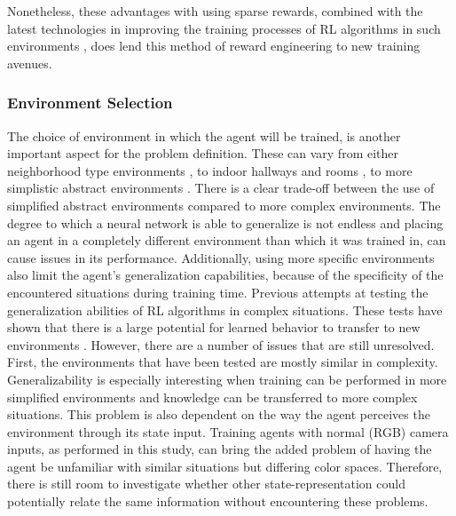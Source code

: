 Nonetheless, these advantages with using sparse rewards, combined with the latest 
technologies in improving the training processes of RL algorithms in 
such environments \cite{HER}, does lend this method of reward engineering 
to new training avenues.  

\subsubsection{Environment Selection}
The choice of environment in which the agent will be trained, is another 
important aspect for the problem definition. These can vary from either 
neighborhood type environments \cite{AirSimDroneNavigation}, to indoor 
hallways and rooms \cite{DroneRLUsingTransferLearning}, to more 
simplistic abstract environments \cite{iowamasterthesis}. There is a clear 
trade-off between the use of simplified abstract environments compared to 
more complex environments. The degree to which a neural network is able 
to generalize is not endless and placing an agent in a completely different 
environment than which it was trained in, can cause issues in its performance. 
Additionally, using more specific environments also limit the agent's 
generalization capabilities, because of the specificity of the encountered 
situations during training time. Previous attempts at testing 
the generalization abilities of RL algorithms in complex situations. These tests 
have shown that there is a large 
potential for learned behavior to transfer to new environments \cite{DroneRLUsingTransferLearning}.
However, there are a number of issues that are still unresolved. First, 
the environments that have been tested are mostly similar in complexity. Generalizability is 
especially interesting when training can be performed in more simplified environments
and knowledge can be transferred to more complex situations. This problem is also 
dependent on the way the agent perceives the environment through its state 
input. Training agents with normal (RGB) camera inputs, as performed in this study, can bring the added 
problem of having the agent be unfamiliar with similar situations but differing 
color spaces. Therefore, there is still room to investigate whether other 
state-representation could potentially relate the same information without 
encountering these problems. 

